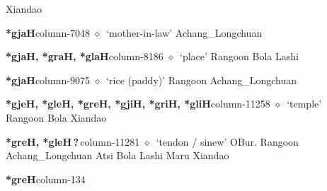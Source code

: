 \hspace{1ex}
         Xiandao 
  \item {\footnotesize \textbf{*gjaH}}{\tiny column-7048}
         $\diamond$~`mother-in-law'
         Achang\_Longchuan 
  \item {\footnotesize \textbf{*gjaH, *graH, *glaH}}{\tiny column-8186}
         $\diamond$~`place'
         Rangoon 
\hspace{1ex}
         Bola 
\hspace{1ex}
         Lashi 
  \item {\footnotesize \textbf{*gjaH}}{\tiny column-9075}
         $\diamond$~`rice (paddy)'
         Rangoon 
\hspace{1ex}
         Achang\_Longchuan 
  \item {\footnotesize \textbf{*gjeH, *gleH, *greH, *gjiH, *griH, *gliH}}{\tiny column-11258}
         $\diamond$~`temple'
         Rangoon 
\hspace{1ex}
         Bola 
\hspace{1ex}
         Xiandao 
  \item {\footnotesize \textbf{*greH, *gleH\,?\,}}{\tiny column-11281}
         $\diamond$~`tendon / sinew'
         OBur. 
\hspace{1ex}
         Rangoon 
\hspace{1ex}
         Achang\_Longchuan 
\hspace{1ex}
         Atsi 
\hspace{1ex}
         Bola 
\hspace{1ex}
         Lashi 
\hspace{1ex}
         Maru 
\hspace{1ex}
         Xiandao 
  \item {\footnotesize \textbf{*greH}}{\tiny column-134}
